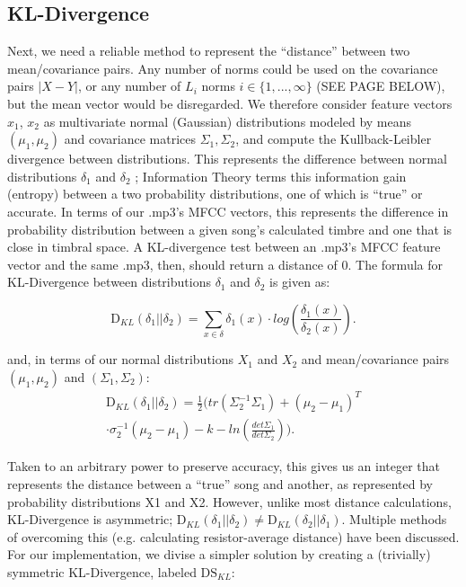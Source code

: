 \documentclass[12pt,twocolumn,titlepage]{article}
\begin{document}
\subsection{KL-Divergence}

Next, we need a reliable method to represent the ``distance'' between two mean/covariance pairs. Any number of norms could be used on the covariance pairs $|X - Y|$, or any number of $L_i$ norms $i \in \{1,...,\infty\}$ (SEE PAGE BELOW), but the mean vector would be disregarded. We therefore consider feature vectors $x_1$, $x_2$ as multivariate normal (Gaussian) distributions modeled by means $(\mu_1, \mu_2)$ and covariance matrices $\Sigma_1, \Sigma_2$, and compute the Kullback-Leibler divergence between distributions. This represents the difference between normal distributions $\delta_1$ and $\delta_2$ \cite{ChiRussel-web}; Information Theory terms this information gain (entropy) between a two probability distributions, one of which is ``true'' or accurate. In terms of our .mp3's MFCC vectors, this represents the difference in probability distribution between a given song's calculated timbre and one that is close in timbral space. A KL-divergence test between an .mp3's MFCC feature vector and the same .mp3, then, should return a distance of 0. The formula for KL-Divergence between distributions $\delta_1$ and $\delta_2$ is given as:

\begin{equation}\label{}
\mathrm{D}_{KL}(\delta_1||\delta_2) = \sum_{x \in \delta}{}{\delta_1(x) \cdot log(\frac{\delta_1(x)}{\delta_2(x)})}.
\end{equation}

and, in terms of our normal distributions $X_1$ and $X_2$ and mean/covariance pairs $(\mu_1, \mu_2)$ and $(\Sigma_1, \Sigma_2)$:
\begin{multline}
\mathrm{D}_{KL}(\delta_1||\delta_2) = \frac{1}{2}\bigg(tr(\Sigma_2^{-1}\Sigma_1) + (\mu_2-\mu_1)^T \\
 \cdot \sigma_2^{-1}(\mu_2-\mu_1)-k-ln(\frac{det\Sigma_1}{det\Sigma_2})\bigg).
\end{multline}

Taken to an arbitrary power to preserve accuracy, this gives us an integer that represents the distance between a ``true'' song and another, as represented by probability distributions X1 and X2. However, unlike most distance calculations, KL-Divergence is asymmetric; $\mathrm{D}_{KL}(\delta_1 || \delta_2) \neq \mathrm{D}_{KL}(\delta_2 || \delta_1)$. Multiple methods of overcoming this (e.g. calculating resistor-average distance) \cite{JohnsonSinaovic} have been discussed. For our implementation, we divise a simpler solution by creating a (trivially) symmetric KL-Divergence, \cite{MaggbladeHongKao} labeled $\mathrm{DS}_{KL}$: 
\end{document}
